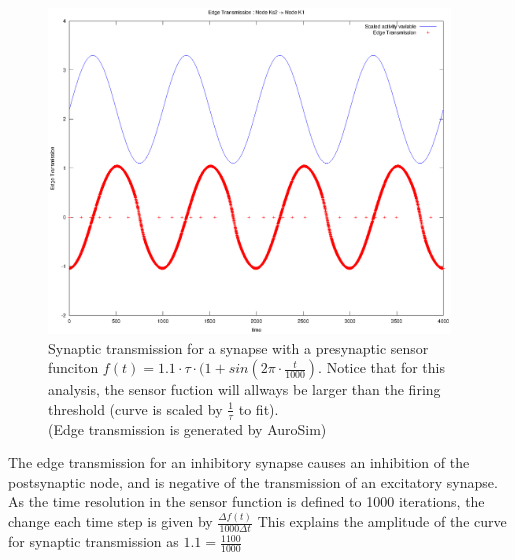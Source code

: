 \begin{figure}[hb!tp]
	\centering
	\includegraphics[width=0.95\textwidth]{./synapticTransmissionPlots/eps_transmissionKappaAboveThreshold} 	
	\caption{Synaptic transmission for a synapse with a presynaptic sensor funciton \mbox{$f(t) = 1.1 \cdot \tau \cdot (1 + sin( 2\pi \cdot \frac{t}{1000})$}. 
			Notice that for this analysis, the sensor fuction will allways be larger than the firing threshold (curve is scaled by $\frac{1}{\tau}$ to fit). \\
			(Edge transmission is generated by AuroSim)} 
	\label{figEdgeTransmissionKaboveT}
\end{figure}

			The edge transmission for an inhibitory synapse causes an inhibition of the postsynaptic node, and is negative of the transmission of an excitatory synapse.
			As the time resolution in the sensor function is defined to 1000 iterations, the change each time step is given by $\frac{\Delta f(t)}{1000 \Delta t}$
			This explains the amplitude of the curve for synaptic transmission as $1.1 = \frac{1100}{1000}$

